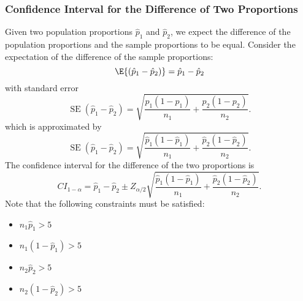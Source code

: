 \documentclass{article}
\begin{document}
\subsubsection{Confidence Interval for the Difference of Two Proportions}
Given two population proportions \(\hat{p}_1\) and \(\hat{p}_2\), we expect the difference of the population proportions
and the sample proportions to be equal. Consider the expectation of the difference of the sample proportions:
\begin{equation*}
    \E{\left( \hat{p}_1 - \hat{p}_2 \right)} = \hat{p}_1 - \hat{p}_2
\end{equation*}
with standard error
\begin{equation*}
    \operatorname{SE}\left( \hat{p}_1 - \hat{p}_2 \right) = \sqrt{\frac{p_1\left( 1 - p_1 \right)}{n_1} + \frac{p_2\left( 1 - p_2 \right)}{n_2}}.
\end{equation*}
which is approximated by
\begin{equation*}
    \operatorname{SE}\left( \hat{p}_1 - \hat{p}_2 \right) = \sqrt{\frac{\hat{p}_1\left( 1 - \hat{p}_1 \right)}{n_1} + \frac{\hat{p}_2\left( 1 - \hat{p}_2 \right)}{n_2}}.
\end{equation*}
The confidence interval for the difference of the two proportions is
\begin{equation*}
    {CI}_{1-\alpha} = \hat{p}_1 - \hat{p}_2 \pm Z_{\alpha/2} \sqrt{\frac{\hat{p}_1\left( 1 - \hat{p}_1 \right)}{n_1} + \frac{\hat{p}_2\left( 1 - \hat{p}_2 \right)}{n_2}}.
\end{equation*}
Note that the following constraints must be satisfied:
\begin{itemize}
    \item \(n_1 \hat{p}_1 > 5\)
    \item \(n_1 \left( 1 - \hat{p}_1 \right) > 5\)
    \item \(n_2 \hat{p}_2 > 5\)
    \item \(n_2 \left( 1 - \hat{p}_2 \right) > 5\)
\end{itemize}
\end{document}
